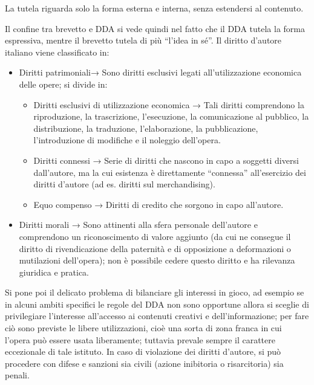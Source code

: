 La tutela riguarda solo la forma esterna e interna, senza estendersi al contenuto.


Il confine tra brevetto e DDA si vede quindi nel fatto che il DDA tutela la forma espressiva, mentre il brevetto tutela di più “l’idea in sé”.
Il diritto d’autore italiano viene classificato in:
\begin{itemize}
    \item Diritti patrimoniali→ Sono diritti esclusivi legati all’utilizzazione economica delle opere; si divide in:
    \begin{itemize}
        \item Diritti esclusivi di utilizzazione economica → Tali diritti comprendono la riproduzione, la trascrizione, l’esecuzione, la comunicazione al pubblico, la distribuzione, la traduzione, l’elaborazione, la pubblicazione, l’introduzione di modifiche e il noleggio dell’opera.
        \item Diritti connessi → Serie di diritti che nascono in capo a soggetti diversi dall’autore, ma la cui esistenza è direttamente “connessa” all’esercizio dei diritti d’autore (ad es. diritti sul merchandising).
        \item Equo compenso → Diritti di credito che sorgono in capo all’autore.
    \end{itemize}
    \item  Diritti morali → Sono attinenti alla sfera personale dell’autore e comprendono un riconoscimento di valore aggiunto (da cui ne consegue il diritto di rivendicazione della paternità e di opposizione a deformazioni o mutilazioni dell’opera); non è possibile cedere questo diritto e ha rilevanza giuridica e pratica.
\end{itemize}

Si pone poi il delicato problema di bilanciare gli interessi in gioco, ad esempio se in alcuni ambiti specifici le regole del DDA non sono opportune allora si sceglie di privilegiare l’interesse all’accesso ai contenuti creativi e dell’informazione; per fare ciò sono previste le libere utilizzazioni, cioè una sorta di zona franca in cui l’opera può essere usata liberamente; tuttavia prevale sempre il carattere eccezionale di tale istituto. In caso di violazione dei diritti d’autore, si può procedere con difese e sanzioni sia civili (azione inibitoria o risarcitoria) sia penali.